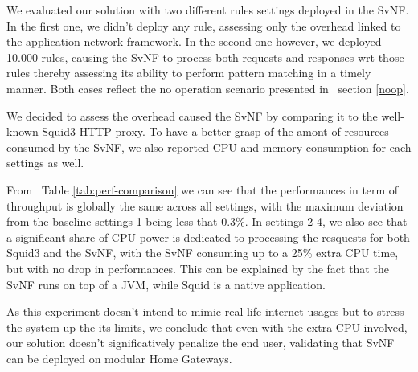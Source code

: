 We evaluated our solution with two different rules settings deployed in the SvNF. In the first one, we didn't deploy any rule, assessing only the overhead linked to the application network framework. In the second one however, we deployed 10.000 rules, causing the SvNF to process both requests and responses wrt those rules thereby assessing its ability to perform pattern matching in a timely manner. Both cases reflect the no operation scenario presented in ~section \ref{noop}.

We decided to assess the overhead caused the SvNF by comparing it to the well-known Squid3 HTTP proxy. To have a better grasp of the amont of resources consumed by the SvNF, we also reported CPU and memory consumption for each settings as well.

From ~Table \ref{tab:perf-comparison} we can see that the performances in term of throughput is globally the same across all settings, with the maximum deviation from the baseline settings 1 being less that 0.3\%.
In settings 2-4, we also see that a significant share of CPU power is dedicated to processing the resquests for both Squid3 and the SvNF, with the SvNF consuming up to a 25\% extra CPU time, but with no drop in performances. This can be explained by the fact that the SvNF runs on top of a JVM, while Squid is a native application.

As this experiment doesn't intend to mimic real life internet usages but to stress the system up the its limits, we conclude that even with the extra CPU involved, our solution doesn't significatively penalize the end user, validating that SvNF can be deployed on modular Home Gateways.

